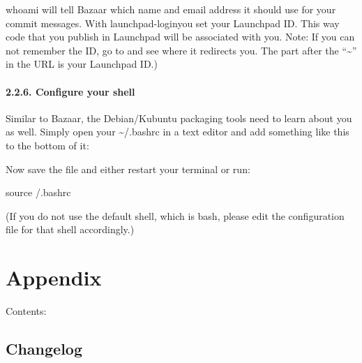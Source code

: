 \documentclass[letterpaper,10pt,english]{sphinxmanual}
\begin{document}
whoami will tell Bazaar which name and email address it should use for your commit messages. With launchpad-loginyou set your Launchpad ID. This way code that you publish in Launchpad will be associated with you.
Note: If you can not remember the ID, go to  and see where it redirects you. The part after the “\textasciitilde{}” in the URL is your Launchpad ID.)


\subsubsection{2.2.6. Configure your shell}
\label{\detokenize{docs/packaging_guide/getting_started:configure-your-shell}}
Similar to Bazaar, the Debian/Kubuntu packaging tools need to learn about you as well. Simply open your \textasciitilde{}/.bashrc in a text editor and add something like this to the bottom of it:

\begin{sphinxVerbatim}[commandchars=\\\{\}]
 
 
\end{sphinxVerbatim}

Now save the file and either restart your terminal or run:

\begin{sphinxVerbatim}[commandchars=\\\{\}]
\PYGZdl{} source \PYGZti{}/.bashrc
\end{sphinxVerbatim}

(If you do not use the default shell, which is bash, please edit the configuration file for that shell accordingly.)


\chapter{Appendix}
\label{\detokenize{docs/appendix/appendix::doc}}\label{\detokenize{docs/appendix/appendix:appendix}}
Contents:


\section{Changelog}
\label{\detokenize{docs/appendix/changes::doc}}\label{\detokenize{docs/appendix/changes:changelog}}
\end{document}
